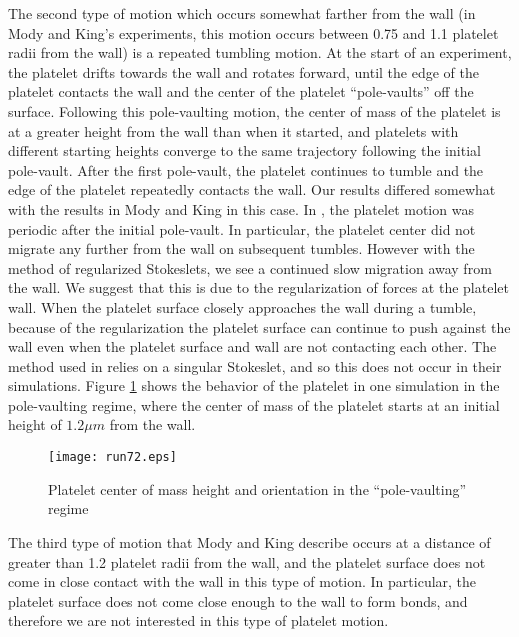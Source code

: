 The second type of motion which occurs somewhat farther from the wall
(in Mody and King's experiments, this motion occurs between 0.75 and
1.1 platelet radii from the wall) is a repeated tumbling motion. At
the start of an experiment, the platelet drifts towards the wall and
rotates forward, until the edge of the platelet contacts the wall and
the center of the platelet ``pole-vaults'' off the surface. Following
this pole-vaulting motion, the center of mass of the platelet is at a
greater height from the wall than when it started, and platelets with
different starting heights converge to the same trajectory following
the initial pole-vault. After the first pole-vault, the platelet
continues to tumble and the edge of the platelet repeatedly contacts
the wall. Our results differed somewhat with the results in Mody and
King in this case. In \cite{Mody2005}, the platelet motion was
periodic after the initial pole-vault. In particular, the platelet
center did not migrate any further from the wall on subsequent
tumbles. However with the method of regularized Stokeslets, we see a
continued slow migration away from the wall. We suggest that this is
due to the regularization of forces at the platelet wall. When the
platelet surface closely approaches the wall during a tumble, because
of the regularization the platelet surface can continue to push
against the wall even when the platelet surface and wall are not
contacting each other. The method used in \cite{Mody2005} relies on a
singular Stokeslet, and so this does not occur in their
simulations. Figure \ref{fig:plt-free-pving} shows the behavior of the
platelet in one simulation in the pole-vaulting regime, where the
center of mass of the platelet starts at an initial height of
$1.2 \mu m$ from the wall.

\begin{figure}
  \centering
  \texttt{[image: run72.eps]}
  \caption[Platelet pole-vaulting motion]{Platelet center of mass
    height and orientation in the ``pole-vaulting'' regime}
  \label{fig:plt-free-pving}
\end{figure}

The third type of motion that Mody and King describe occurs at a
distance of greater than 1.2 platelet radii from the wall, and the
platelet surface does not come in close contact with the wall in this
type of motion. In particular, the platelet surface does not come
close enough to the wall to form bonds, and therefore we are not
interested in this type of platelet motion.

